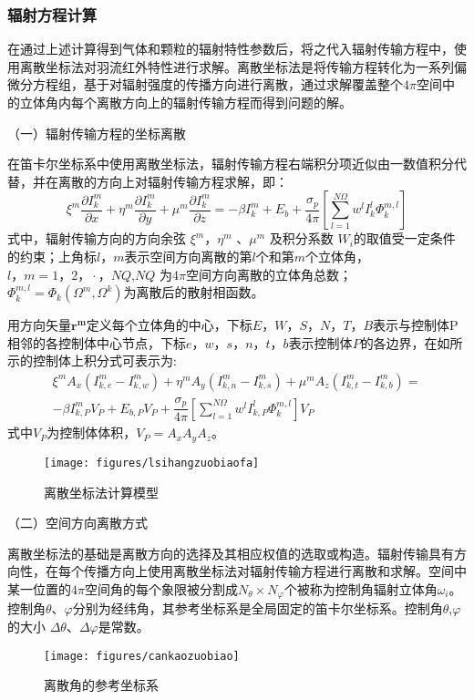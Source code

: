 \subsubsection{辐射方程计算}
在通过上述计算得到气体和颗粒的辐射特性参数后，将之代入辐射传输方程中，使用离散坐标法对羽流红外特性进行求解。离散坐标法是将传输方程转化为一系列偏微分方程组，基于对辐射强度的传播方向进行离散，通过求解覆盖整个$4\pi$空间中的立体角内每个离散方向上的辐射传输方程而得到问题的解。

（一）辐射传输方程的坐标离散

在笛卡尔坐标系中使用离散坐标法，辐射传输方程右端积分项近似由一数值积分代替，并在离散的方向上对辐射传输方程求解，即：
\begin{equation}
{\xi ^m}\frac{{\partial I_k^m}}{{\partial x}} + {\eta ^m}\frac{{\partial I_k^m}}{{\partial y}} + {\mu ^m}\frac{{\partial I_k^m}}{{\partial z}} =  - \beta I_k^m + {E_b} + \frac{{{\sigma _p}}}{{4\pi }}[\sum\limits_{l = 1}^{N\Omega } {{w^l}I_k^l\Phi _k^{m,l}} ]
\end{equation}
式中，辐射传输方向的方向余弦 $\xi ^m$，$\eta ^m$ 、$\mu ^m$ 及积分系数 $W_i$的取值受一定条件的约束；上角标$l\text{，}m$表示空间方向离散的第$l$个和第$m$个立体角，$l\text{，}m=1\text{，}2\text{，}\cdot\text{，} NQ$,$NQ$ 为$4\pi$空间方向离散的立体角总数； $\Phi _k^{m,l} = {\Phi _k}({\Omega ^m},{\Omega ^k})$为离散后的散射相函数。

用方向矢量$\mathbf{r^m}$定义每个立体角的中心，下标$E\text{，}W\text{，}S\text{，}N\text{，}T\text{，}B$表示与控制体P相邻的各控制体中心节点，下标$e$，$w$，$s$，$n$，$t$，$b$表示控制体$P$的各边界，在如所示的控制体上积分式可表示为:
\begin{equation}
\begin{array}{l}
{\xi ^m}{A_x}(I_{k,e}^m - I_{k,w}^m) + {\eta ^m}{A_y}(I_{k,n}^m - I_{k,s}^m) + {\mu ^m}{A_z}(I_{k,t}^m - I_{k,b}^m) = \\
- \beta I_{k,P}^m{V_P} + {E_{b,P}}{V_P} + \dfrac{{{\sigma _p}}}{{4\pi }}[\sum\limits_{l = 1}^{N\Omega } {{w^l}I_{k,P}^l\Phi _k^{m,l}} ]{V_P} \label{eq:kongzhitijifeng}
\end{array}
\end{equation}
式中$V_P$为控制体体积，$V_P=A_xA_yA_z$。
\begin{figure}[htbp]
	\centering
	\texttt{[image: figures/lsihangzuobiaofa]}
	\caption{离散坐标法计算模型}
	\label{fig:lsihangzuobiaofa}
\end{figure}
（二）空间方向离散方式

离散坐标法的基础是离散方向的选择及其相应权值的选取或构造。辐射传输具有方向性，在每个传播方向上使用离散坐标法对辐射传输方程进行离散和求解。空间中某一位置的$4\pi$空间角的每个象限被分割成$N_\theta \times N_\varphi$个被称为控制角辐射立体角$\omega_i$。控制角$\theta$、$\varphi$分别为经纬角，其参考坐标系是全局固定的笛卡尔坐标系。控制角$\theta$,$\varphi$的大小 $\Delta\theta$、$\Delta\varphi$是常数。
\begin{figure}[htbp]
	\centering
	\texttt{[image: figures/cankaozuobiao]}
	\caption{离散角的参考坐标系}
	\label{fig:cankaozuobiao}
\end{figure}

